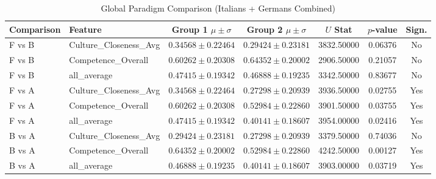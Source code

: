 \begin{table}
\caption{Global Paradigm Comparison (Italians + Germans Combined)}
\label{tab:global_paradigms}
\begin{tabular}{llccccc}
\toprule
Comparison & Feature & Group 1 $\mu \pm \sigma$ & Group 2 $\mu \pm \sigma$ & $U$ Stat & $p$-value & Sign. \\
\midrule
F vs B & Culture_Closeness_Avg & $0.34568 \pm 0.22464$ & $0.29424 \pm 0.23181$ & 3832.50000 & 0.06376 & No \\
F vs B & Competence_Overall & $0.60262 \pm 0.20308$ & $0.64352 \pm 0.20002$ & 2906.50000 & 0.21057 & No \\
F vs B & all_average & $0.47415 \pm 0.19342$ & $0.46888 \pm 0.19235$ & 3342.50000 & 0.83677 & No \\
F vs A & Culture_Closeness_Avg & $0.34568 \pm 0.22464$ & $0.27298 \pm 0.20939$ & 3936.50000 & 0.02755 & Yes \\
F vs A & Competence_Overall & $0.60262 \pm 0.20308$ & $0.52984 \pm 0.22860$ & 3901.50000 & 0.03755 & Yes \\
F vs A & all_average & $0.47415 \pm 0.19342$ & $0.40141 \pm 0.18607$ & 3954.00000 & 0.02416 & Yes \\
B vs A & Culture_Closeness_Avg & $0.29424 \pm 0.23181$ & $0.27298 \pm 0.20939$ & 3379.50000 & 0.74036 & No \\
B vs A & Competence_Overall & $0.64352 \pm 0.20002$ & $0.52984 \pm 0.22860$ & 4242.50000 & 0.00127 & Yes \\
B vs A & all_average & $0.46888 \pm 0.19235$ & $0.40141 \pm 0.18607$ & 3903.00000 & 0.03719 & Yes \\
\bottomrule
\end{tabular}
\end{table}

